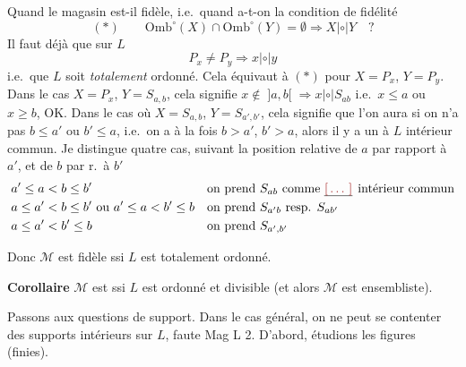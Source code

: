 \documentclass[11pt,a4paper]{article}
\begin{document}

Quand le magasin est-il fidèle, i.e.\ quand a-t-on la condition de fidélité
\[
(*) \qquad \mathrm{Omb}^\circ(X) \cap \mathrm{Omb}^\circ(Y) = \emptyset \Longrightarrow X \mathrel{|{\circ}|} Y \quad ?
\]
Il faut déjà que sur $L$
\[
P_x \neq P_y \Longrightarrow x \mathrel{|{\circ}|} y
\]
i.e.\ que $L$ soit \textit{totalement} ordonné. Cela équivaut à $(*)$ pour $X = P_x$, $Y = P_y$. Dans le cas $X = P_x$, $Y = S_{a,b}$, cela signifie $x\notin\;]a,b[\; \Longrightarrow x \mathrel{|{\circ}|} S_{ab}$ i.e.\ $x\le a$ ou $x\ge b$, OK. Dans le cas où $X = S_{a,b}$, $Y = S_{a',b'}$, cela signifie que l'on aura  si on n'a pas $b\le a'$ ou $b'\le a$, i.e.\ on a à la fois \emph{$b>a'$}, \emph{$b'>a$}, alors il y a un \ill{} à $L$  intérieur commun. Je distingue quatre cas, suivant la position relative de $a$ par rapport à $a'$, et de $b$ par r.\ à $b'$
\[
\begin{aligned}
&a'\le a<b\le b' && \text{on prend } S_{ab} \text{ comme \uncertain{\ill{}} intérieur commun}\\
&a\le a'<b\le b' \text{ ou } a'\le a<b'\le b && \text{on prend } S_{a'b} \text{ resp. } S_{ab'}\\
&a\le a'<b'\le b && \text{on prend } S_{a',b'}
\end{aligned}
\]

Donc  $\mathcal{M}$ est fidèle ssi $L$ est totalement ordonné.

\textbf{Corollaire} $\mathcal{M}$ est  ssi $L$ est  ordonné et divisible (et alors $\mathcal{M}$ est \ill{} ensembliste).


Passons aux questions de support. Dans le cas général, on ne peut se contenter des supports intérieurs sur $L$, faute  Mag L 2. \struck{\ill{}} D'abord, étudions les figures (finies).

\end{document}
